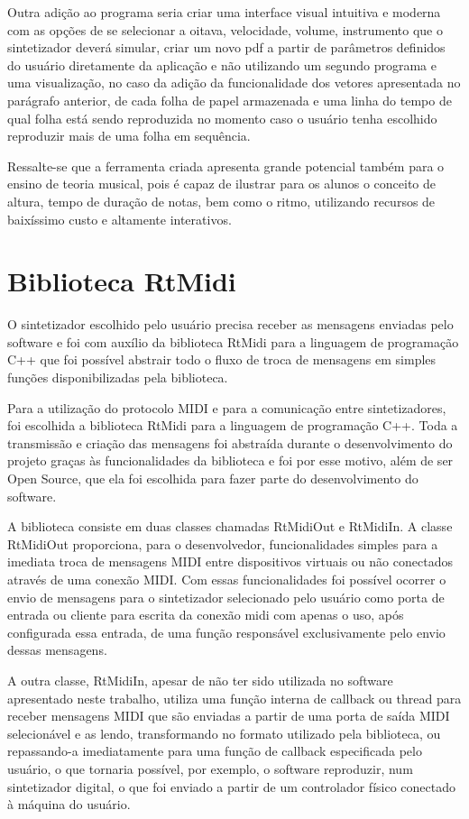 \documentclass[12pt]{report}
\begin{document}
Outra adição ao programa seria criar uma interface visual intuitiva e
moderna com as opções de se selecionar a oitava, velocidade, volume,
instrumento que o sintetizador deverá simular, criar um novo pdf a
partir de parâmetros definidos do usuário diretamente da aplicação e
não utilizando um segundo programa e uma visualização, no caso da
adição da funcionalidade dos vetores apresentada no parágrafo
anterior, de cada folha de papel armazenada e uma linha do tempo de
qual folha está sendo reproduzida no momento caso o usuário tenha
escolhido reproduzir mais de uma folha em sequência.

Ressalte-se que a ferramenta criada apresenta grande potencial também
para o ensino de teoria musical, pois é capaz de ilustrar para os
alunos o conceito de altura, tempo de duração de notas, bem como o
ritmo, utilizando recursos de baixíssimo custo e altamente interativos.

\appendix
\chapter{Biblioteca RtMidi}

O sintetizador escolhido pelo usuário precisa receber as mensagens
enviadas pelo software e foi com auxílio da biblioteca RtMidi para a
linguagem de programação C++ que foi possível abstrair todo o fluxo de
troca de mensagens em simples funções disponibilizadas pela
biblioteca.

Para a utilização do protocolo MIDI e para a comunicação entre
sintetizadores, foi escolhida a biblioteca RtMidi para a linguagem de
programação C++. Toda a transmissão e criação das mensagens foi
abstraída durante o desenvolvimento do projeto graças às
funcionalidades da biblioteca e foi por esse motivo, além de ser Open
Source, que ela foi escolhida para fazer parte do desenvolvimento do
software.

A biblioteca consiste em duas classes chamadas RtMidiOut e RtMidiIn. A
classe RtMidiOut proporciona, para o desenvolvedor, funcionalidades
simples para a imediata troca de mensagens MIDI entre dispositivos
virtuais ou não conectados através de uma conexão MIDI. Com essas
funcionalidades foi possível ocorrer o envio de mensagens para o
sintetizador selecionado pelo usuário como porta de entrada ou cliente
para escrita da conexão midi com apenas o uso, após configurada essa
entrada, de uma função responsável exclusivamente pelo envio dessas
mensagens.

A outra classe, RtMidiIn, apesar de não ter sido utilizada no software
apresentado neste trabalho, utiliza uma função interna de callback ou
thread para receber mensagens MIDI que são enviadas a partir de uma
porta de saída MIDI selecionável e as lendo, transformando no formato
utilizado pela biblioteca, ou repassando-a imediatamente para uma
função de callback especificada pelo usuário, o que tornaria possível,
por exemplo, o software reproduzir, num sintetizador digital, o que
foi enviado a partir de um controlador físico conectado à máquina do
usuário.
\end{document}
